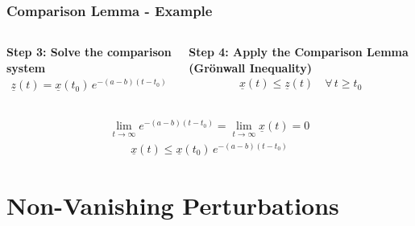 \documentclass[student, noshadow, lsr, english, aspectratio=169, t]{ITR_LSR_slides}
\begin{document}
\begin{frame}
    \frametitle{Comparison Lemma - Example}
    \begin{columns}
        \textbf{Step 3: Solve the comparison system} \\
        \begin{align*}
            \underline{z}(t) = \underline{x}(t_0)\, e^{-(a - b)(t - t_0)}
        \end{align*}

        \textbf{Step 4: Apply the Comparison Lemma (Grönwall Inequality)}
        \begin{align*}
            \underline{x}(t) \leq \underline{z}(t) \quad \forall\, t \geq t_0
        \end{align*}
    \end{columns}

    \vspace{0.3cm}
    \begin{tcolorbox}[title=Conclusion: Exponential Stability of the Perturbed System]
        \vspace{-0.4cm}
        \begin{align*}
            \lim_{t \to \infty} e^{-(a - b)(t - t_0)} = \lim_{t \to \infty} \underline{x}(t) = 0
        \end{align*}
        \begin{align*}
            \underline{x}(t) \leq \underline{x}(t_0)\, e^{-(a - b)(t - t_0)}
        \end{align*}
    \end{tcolorbox}
\end{frame}

\section{Non-Vanishing Perturbations}
\end{document}
